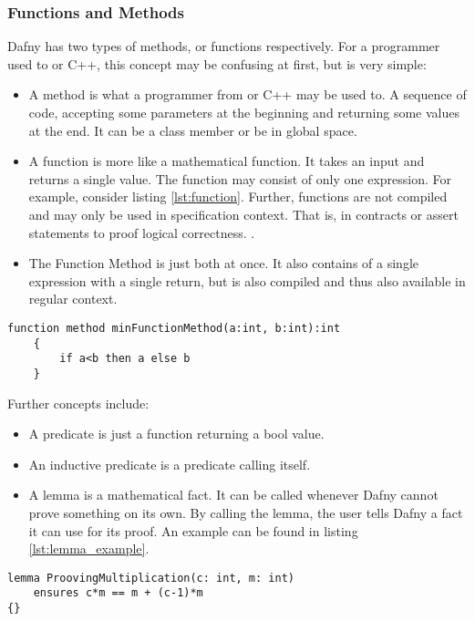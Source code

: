 \subsubsection{Functions and Methods}
Dafny has two types of methods, or functions respectively. For a programmer used to \Csharp or C++, this concept may be confusing at first, but is very simple:
\begin{itemize}
\item A method is what a programmer from \Csharp or C++ may be used to. A sequence of code, accepting some parameters at the beginning and returning some values at the end. It can be a class member or be in global space.
\item A function is more like a mathematical function. It takes an input and returns a single value. The function may consist of only one expression. For example, consider listing \ref{lst:function}. Further, functions are not compiled and may only be used in specification context. That is, in contracts or assert statements to proof logical correctness. \cite{functionVSMethod}.
\item The Function Method is just both at once. It also contains of a single expression with a single return, but is also compiled and thus also available in regular context. \cite{functionVSMethod}
\end{itemize}

\begin{lstlisting}[caption={Function}, captionpos=b, label={lst:function}]
    function method minFunctionMethod(a:int, b:int):int
    {
        if a<b then a else b
    }
\end{lstlisting}

Further concepts include:
\begin{itemize}
\item A predicate is just a function returning a bool value.
\item An inductive predicate is a predicate calling itself.
\item A lemma is a mathematical fact. It can be called whenever Dafny cannot prove something on its own. By calling the lemma, the user tells Dafny a fact it can use for its proof. An example can be found in listing \ref{lst:lemma_example}. \cite{dafnyReferenceManual}
\end{itemize}

\begin{lstlisting}[caption={Lemma}, captionpos=b, label={lst:lemma_example}]
lemma ProovingMultiplication(c: int, m: int)
    ensures c*m == m + (c-1)*m
{}
\end{lstlisting}


